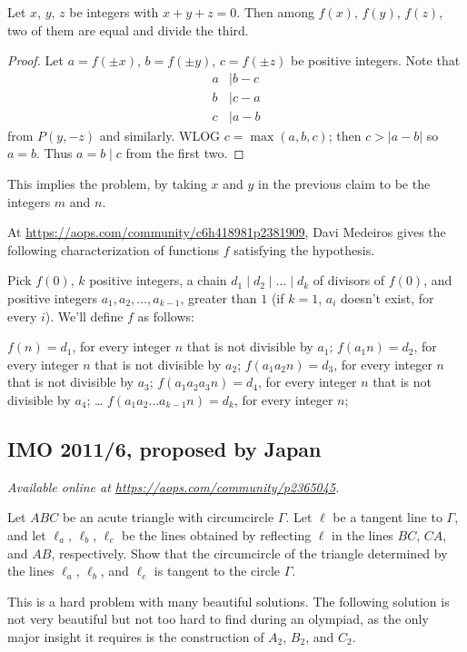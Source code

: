 \documentclass[11pt]{scrartcl}
\begin{document}
\begin{claim*}
  Let $x$, $y$, $z$ be integers with $x+y+z=0$.
  Then among $f(x)$, $f(y)$, $f(z)$,
  two of them are equal and divide the third.
\end{claim*}
\begin{proof}
  Let $a = f(\pm x)$, $b = f(\pm y)$, $c = f(\pm z)$
  be positive integers.
  Note that
  \begin{align*}
    a &\mid b-c \\
    b &\mid c-a \\
    c &\mid a-b
  \end{align*}
  from $P(y,-z)$ and similarly.
  WLOG $c = \max(a,b,c)$; then $c > |a-b|$
  so $a=b$.  Thus $a=b \mid c$ from the first two.
\end{proof}
This implies the problem,
by taking $x$ and $y$ in the previous claim
to be the integers $m$ and $n$.

\begin{remark*}
  At \url{https://aops.com/community/c6h418981p2381909},
  Davi Medeiros gives the following characterization
  of functions $f$ satisfying the hypothesis.

  Pick $f(0)$, $k$ positive integers,
  a chain $d_1 \mid d_2 \mid \dots \mid d_k$ of divisors of $f(0)$,
  and positive integers $a_1,a_2,\dots,a_{k-1}$,
  greater than $1$ (if $k=1$, $a_i$ doesn't exist, for every $i$).
  We'll define $f$ as follows:
  \begin{itemize}
    \ii $f(n)=d_1$, for every integer $n$ that is not divisible by $a_1$;
    \ii $f(a_1n)=d_2$, for every integer $n$ that is not divisible by $a_2$;
    \ii $f(a_1a_2n)=d_3$, for every integer $n$ that is not divisible by $a_3$;
    \ii $f(a_1a_2a_3n)=d_4$, for every integer $n$ that is not divisible by $a_4$;
    \ii \dots
    \ii $f(a_1a_2 \dots a_{k-1}n)=d_k$, for every integer $n$;
  \end{itemize}
\end{remark*}
\pagebreak

\subsection{IMO 2011/6, proposed by Japan}
\textsl{Available online at \url{https://aops.com/community/p2365045}.}
\begin{mdframed}[style=mdpurplebox,frametitle={Problem statement}]
Let $ABC$ be an acute triangle with circumcircle $\Gamma$.
Let $\ell$ be a tangent line to $\Gamma$, and let $\ell_a$, $\ell_b$, $\ell_c$ be the lines obtained
by reflecting $\ell$ in the lines $BC$, $CA$, and $AB$, respectively.
Show that the circumcircle of the triangle determined by the lines $\ell_a$, $\ell_b$, and $\ell_c$
is tangent to the circle $\Gamma$.
\end{mdframed}
This is a hard problem with many beautiful solutions.
The following solution is not very beautiful but not too hard to find during an olympiad,
as the only major insight it requires is the construction of $A_2$, $B_2$, and $C_2$.
\end{document}
